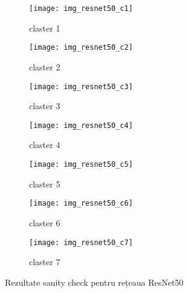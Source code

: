 \begin{figure}[!tbp]
  \centering
  \begin{subfigure}[b]{0.48\textwidth}
    \texttt{[image: img\_resnet50\_c1]}
    \caption{claster 1}
  \end{subfigure}
  \hfill
  \begin{subfigure}[b]{0.48\textwidth}
    \texttt{[image: img\_resnet50\_c2]}
    \caption{claster 2}
  \end{subfigure}
   \hfill
  \begin{subfigure}[b]{0.48\textwidth}
    \texttt{[image: img\_resnet50\_c3]}
    \caption{claster 3}
  \end{subfigure}
  \hfill
  \begin{subfigure}[b]{0.48\textwidth}
    \texttt{[image: img\_resnet50\_c4]}
    \caption{claster 4}
  \end{subfigure}
  \hfill
  \begin{subfigure}[b]{0.48\textwidth}
    \texttt{[image: img\_resnet50\_c5]}
    \caption{claster 5}
  \end{subfigure}
  \hfill
  \begin{subfigure}[b]{0.48\textwidth}
    \texttt{[image: img\_resnet50\_c6]}
    \caption{claster 6}
  \end{subfigure}
    \hfill
  \begin{subfigure}[b]{0.48\textwidth}
    \texttt{[image: img\_resnet50\_c7]}
    \caption{claster 7}
  \end{subfigure}
  \caption[Rezultate sanity check pentru rețeaua ResNet50]{Rezultate sanity check pentru rețeaua ResNet50}
\end{figure}

